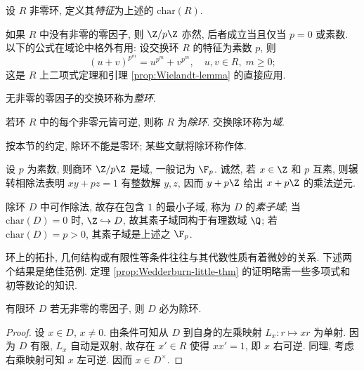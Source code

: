 \begin{definition}\label{def:ring-characteristic}
	设 $R$ 非零环, 定义其\emph{特征}为上述的 $\text{char}(R)$. 
\end{definition}
如果 $R$ 中没有非零的零因子, 则 $\Z/p\Z$ 亦然, 后者成立当且仅当 $p=0$ 或素数. 以下的公式在域论中格外有用: 设交换环 $R$ 的特征为素数 $p$, 则
\begin{equation}\label{eqn:freshmen-dream}
	(u+v)^{p^m} = u^{p^m} + v^{p^m}, \quad u, v \in R, \; m \geq 0;
\end{equation}
这是 $R$ 上二项式定理和引理 \ref{prop:Wielandt-lemma} 的直接应用.

\begin{definition}
	无非零的零因子的交换环称为\emph{整环}.
\end{definition}

\begin{definition}\label{def:field}
	若环 $R$ 中的每个非零元皆可逆, 则称 $R$ 为\emph{除环}. 交换除环称为\emph{域}.
\end{definition}
按本节的约定, 除环不能是零环; 某些文献将除环称作体.

\begin{example} 
	设 $p$ 为素数, 则商环 $\Z/p\Z$ 是域, 一般记为 $\F_p$. 诚然, 若 $x \in \Z$ 和 $p$ 互素, 则辗转相除法表明 $xy + pz = 1$ 有整数解 $y,z$, 因而 $y+p\Z$ 给出 $x+p\Z$ 的乘法逆元.
\end{example}
除环 $D$ 中可作除法, 故存在包含 $1$ 的最小子域, 称为 $D$ 的\emph{素子域}; 当 $\text{char}(D)=0$ 时, $\Z \hookrightarrow D$, 故其素子域同构于有理数域 $\Q$; 若 $\text{char}(D)=p > 0$, 其素子域是上述之 $\F_p$. 

环上的拓扑, 几何结构或有限性等条件往往与其代数性质有着微妙的关系. 下述两个结果是绝佳范例. 定理 \ref{prop:Wedderburn-little-thm} 的证明略需一些多项式和初等数论的知识.

\begin{proposition}
	有限环 $D$ 若无非零的零因子, 则 $D$ 必为除环. 
\end{proposition}
\begin{proof}
	设 $x \in D$, $x \neq 0$. 由条件可知从 $D$ 到自身的左乘映射 $L_x: r \mapsto xr$ 为单射. 因为 $D$ 有限, $L_x$ 自动是双射, 故存在 $x' \in R$ 使得 $xx'=1$, 即 $x$ 右可逆. 同理, 考虑右乘映射可知 $x$ 左可逆. 因而 $x \in D^\times$.
\end{proof}

